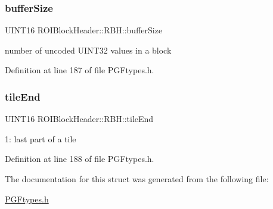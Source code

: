 \subsubsection{\texorpdfstring{bufferSize}{bufferSize}}
{\footnotesize\ttfamily U\+I\+N\+T16 R\+O\+I\+Block\+Header\+::\+R\+B\+H\+::buffer\+Size}



number of uncoded U\+I\+N\+T32 values in a block 



Definition at line 187 of file P\+G\+Ftypes.\+h.

\mbox{\label{structROIBlockHeader_1_1RBH_ac9ec75c32770d57468eaab631fd316c4}} 
\subsubsection{\texorpdfstring{tileEnd}{tileEnd}}
{\footnotesize\ttfamily U\+I\+N\+T16 R\+O\+I\+Block\+Header\+::\+R\+B\+H\+::tile\+End}



1\+: last part of a tile 



Definition at line 188 of file P\+G\+Ftypes.\+h.



The documentation for this struct was generated from the following file\+:\begin{DoxyCompactItemize}
\item 
\mbox{\hyperlink{PGFtypes_8h}{P\+G\+Ftypes.\+h}}\end{DoxyCompactItemize}
